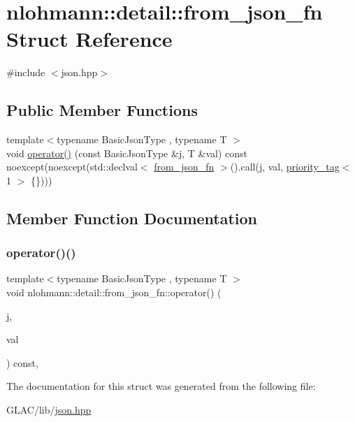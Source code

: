 \hypertarget{structnlohmann_1_1detail_1_1from__json__fn}{}\section{nlohmann\+::detail\+::from\+\_\+json\+\_\+fn Struct Reference}
\label{structnlohmann_1_1detail_1_1from__json__fn}


{\ttfamily \#include $<$json.\+hpp$>$}

\subsection*{Public Member Functions}
\begin{DoxyCompactItemize}
\item 
{\footnotesize template$<$typename Basic\+Json\+Type , typename T $>$ }\\void \mbox{\hyperlink{structnlohmann_1_1detail_1_1from__json__fn_a48e82ad9d244fdf249caa970a253e214}{operator()}} (const Basic\+Json\+Type \&j, T \&val) const noexcept(noexcept(std\+::declval$<$ \mbox{\hyperlink{structnlohmann_1_1detail_1_1from__json__fn}{from\+\_\+json\+\_\+fn}} $>$().call(j, val, \mbox{\hyperlink{structnlohmann_1_1detail_1_1priority__tag}{priority\+\_\+tag}}$<$ 1 $>$ \{\})))
\end{DoxyCompactItemize}


\subsection{Member Function Documentation}
\mbox{\label{structnlohmann_1_1detail_1_1from__json__fn_a48e82ad9d244fdf249caa970a253e214}} 
\subsubsection{\texorpdfstring{operator()()}{operator()()}}
{\footnotesize\ttfamily template$<$typename Basic\+Json\+Type , typename T $>$ \\
void nlohmann\+::detail\+::from\+\_\+json\+\_\+fn\+::operator() (\begin{DoxyParamCaption}\item[{const Basic\+Json\+Type \&}]{j,  }\item[{T \&}]{val }\end{DoxyParamCaption}) const\hspace{0.3cm}{\ttfamily [inline]}, {\ttfamily [noexcept]}}



The documentation for this struct was generated from the following file\+:\begin{DoxyCompactItemize}
\item 
G\+L\+A\+C/lib/\mbox{\hyperlink{json_8hpp}{json.\+hpp}}\end{DoxyCompactItemize}
